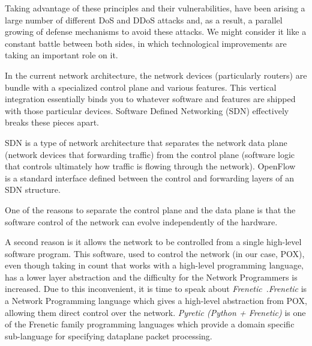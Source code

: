 \bigskip

Taking advantage of these principles and their vulnerabilities, have been arising a large number of different DoS and DDoS attacks and, as a result, a parallel growing of defense mechanisms to avoid these attacks. We might consider it like a constant battle between both sides, in which technological improvements are taking an important role on it. 
 
\par

In the current network architecture, the network devices (particularly routers) are bundle with a specialized control plane and various features. This vertical integration essentially binds you to whatever software and features are shipped with those particular devices. Software Defined Networking (SDN) effectively breaks these pieces apart.

\par

SDN is a type of network architecture that separates the network data plane (network devices that forwarding traffic) from the control plane (software logic that controls ultimately how traffic is flowing through the network). OpenFlow~\cite{OpenFlowWP} is a standard interface defined between the control and forwarding layers of an SDN structure. 

\par

One of the reasons to separate the control plane and the data plane is that the software control of the network can evolve independently of the hardware. 

\par

A second reason is it allows the network to be controlled from a single high-level software program. This software, used to control the network (in our case, POX), even though taking in count that works with a high-level programming language, has a lower layer abstraction and the difficulty for the Network Programmers is increased. Due to this inconvenient, it is time to speak about \textit{Frenetic}~\cite{FreneticWP}.\textit{Frenetic} is a Network Programming language which gives a high-level abstraction from POX, allowing them direct control over the network. \textit{Pyretic (Python + Frenetic)} is one of the Frenetic family programming languages which provide a domain specific sub-language for specifying dataplane packet processing.

\par

